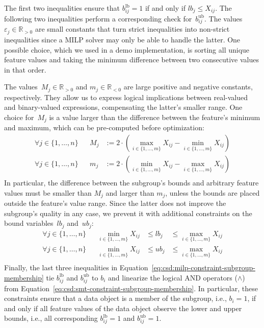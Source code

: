 \documentclass{article}
\theoremstyle{definition}
\begin{document}
%
The first two inequalities ensure that $b^{\text{lb}}_{ij} = 1$ if and only if $\mathit{lb}_j \leq X_{ij}$.
The following two inequalities perform a corresponding check for~$b^{\text{ub}}_{ij}$.
The values~$\varepsilon_j \in \mathbb{R}_{> 0}$ are small constants that turn strict inequalities into non-strict inequalities since a MILP solver may only be able to handle the latter.
One possible choice, which we used in a demo implementation, is sorting all unique feature values and taking the minimum difference between two consecutive values in that order.

The values~$M_j \in \mathbb{R}_{> 0}$ and $m_j \in \mathbb{R}_{< 0}$ are large positive and negative constants, respectively.
They allow us to express logical implications between real-valued and binary-valued expressions, compensating the latter's smaller range.
One choice for~$M_j$ is a value larger than the difference between the feature's minimum and maximum, which can be pre-computed before optimization:
%
\begin{equation}
	\begin{aligned}
		\forall j \in \{1, \dots, n\} & & M_j &:= 2 \cdot \left( \max_{i \in \{1, \dots, m\}} X_{ij} - \min_{i \in \{1, \dots, m\}} X_{ij} \right) \\
		\forall j \in \{1, \dots, n\} & & m_j &:= 2 \cdot \left( \min_{i \in \{1, \dots, m\}} X_{ij} - \max_{i \in \{1, \dots, m\}} X_{ij} \right) \\
	\end{aligned}
	\label{eq:csd:milp-big-m}
\end{equation}
%
In particular, the difference between the subgroup's bounds and arbitrary feature values must be smaller than $M_j$ and larger than $m_j$, unless the bounds are placed outside the feature's value range.
Since the latter does not improve the subgroup's quality in any case, we prevent it with additional constraints on the bound variables~$\mathit{lb}_j$ and~$\mathit{ub}_j$:
%
\begin{equation}
	\begin{aligned}
		\forall j \in \{1, \dots, n\} & & \min_{i \in \{1, \dots, m\}} X_{ij} &\leq \mathit{lb}_j &\leq \max_{i \in \{1, \dots, m\}} X_{ij} \\
		\forall j \in \{1, \dots, n\} & & \min_{i \in \{1, \dots, m\}} X_{ij} &\leq \mathit{ub}_j &\leq \max_{i \in \{1, \dots, m\}} X_{ij} \\
	\end{aligned}
	\label{eq:csd:milp-constraint-bounds-in-range}
\end{equation}
%
Finally, the last three inequalities in Equation~\ref{eq:csd:milp-constraint-subgroup-membership} tie $b^{\text{lb}}_{ij}$ and $b^{\text{ub}}_{ij}$ to $b_i$ and linearize the logical AND operators ($\land$) from Equation~\ref{eq:csd:smt-constraint-subgroup-membership}.
In particular, these constraints ensure that a data object is a member of the subgroup, i.e., $b_i = 1$, if and only if all feature values of the data object observe the lower and upper bounds, i.e., all corresponding $b^{\text{lb}}_{ij} = 1$ and $b^{\text{ub}}_{ij} = 1$.
\end{document}
